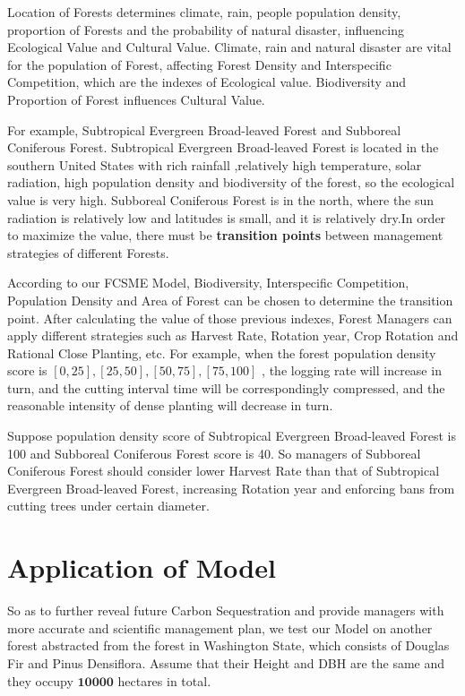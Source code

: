 \documentclass{mcmthesis}
\numberwithin{figure}{section}
\numberwithin{table}{section}
\numberwithin{equation}{section}
\begin{document}
Location of Forests determines climate, rain, people population density, proportion 
of Forests and the probability of natural disaster, influencing Ecological Value and 
Cultural Value. Climate, rain and natural disaster are vital for the population of 
Forest, affecting Forest Density and Interspecific Competition, which are the indexes 
of Ecological value. Biodiversity and Proportion of Forest influences Cultural Value.
\par
For example, Subtropical Evergreen Broad-leaved Forest and Subboreal Coniferous Forest. 
Subtropical Evergreen Broad-leaved Forest is located in the southern United States with rich rainfall 
,relatively high temperature, solar radiation, high population density and 
biodiversity of the forest, so the ecological value is very high. Subboreal Coniferous Forest
is in the north, where the sun radiation is relatively low and latitudes is small, 
and it is relatively dry.In order to maximize the value, there must be \textbf{transition points} 
between management strategies of different Forests.
\par
According to our FCSME Model, Biodiversity, Interspecific Competition, Population 
Density and Area of Forest can be chosen to determine the transition point. After 
calculating the value of those previous indexes, Forest Managers can apply different 
strategies such as Harvest Rate, Rotation year, Crop Rotation and Rational Close 
Planting, etc. For example, when the forest population density score is 
$ [0,25],[25,50],[50,75],[75,100] $ , the logging rate will increase in turn, and the 
cutting interval time will be correspondingly compressed, and the reasonable intensity 
of dense planting will decrease in turn.
\par
Suppose population density score of Subtropical Evergreen Broad-leaved Forest is 
100 and Subboreal Coniferous Forest score is 40. So managers of Subboreal Coniferous Forest
should consider lower Harvest Rate than that of Subtropical Evergreen Broad-leaved Forest, 
increasing Rotation year and enforcing bans from cutting trees under certain diameter. 






\section{Application of Model}
So as to further reveal future Carbon Sequestration and provide managers with 
more accurate and scientific management plan, we test our Model on another forest abstracted from the forest in Washington State, which 
consists of Douglas Fir and Pinus Densiflora. Assume that their Height and DBH are
the same and they occupy $ \bm{10000} $  hectares in total. 
\end{document}
